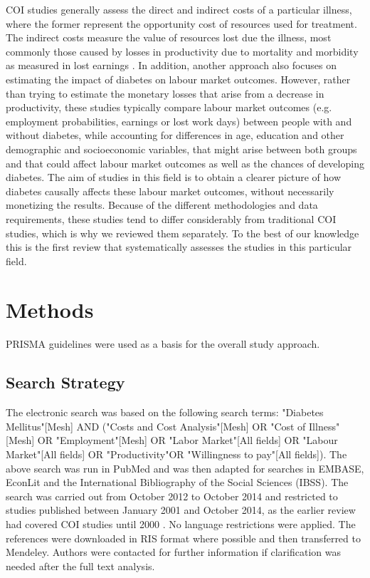 \documentclass[12pt,english]{article}
\begin{document}
\ac{COI} studies generally assess the direct and indirect costs of a particular illness, where the former represent the opportunity cost of resources used for treatment. The indirect costs measure the value of resources lost due the illness, most commonly those caused by losses in productivity due to mortality and morbidity as measured in lost earnings \parencite{Segel2006}. In addition, another approach also focuses on estimating the impact of diabetes on labour market outcomes. However, rather than trying to estimate the monetary losses that arise from a decrease in productivity, these studies typically compare labour market outcomes (e.g. employment probabilities, earnings or lost work days) between people with and without diabetes, while accounting for differences in age, education and other demographic and socioeconomic variables, that might arise between both groups and that could affect labour market outcomes as well as the chances of developing diabetes. The aim of studies in this field is to obtain a clearer picture of how diabetes causally affects these labour market outcomes, without necessarily monetizing the results. Because of the different methodologies and data requirements, these studies tend to differ considerably from traditional \ac{COI} studies, which is why we reviewed them separately. To the best of our knowledge this is the first review that systematically assesses the studies in this particular field.

\section{Methods}

\ac{PRISMA} guidelines were used as a basis for the overall study approach.\parencite{Moher2009b}
\subsection{Search Strategy}
The electronic search was based on the following search terms: "Diabetes Mellitus"[Mesh] AND ("Costs and Cost Analysis"[Mesh] OR "Cost of Illness"[Mesh] OR "Employment"[Mesh] OR "Labor Market"[All fields] OR "Labour Market"[All fields] OR "Productivity"OR "Willingness to pay"[All fields]). The above search was run in PubMed and was then adapted for searches in EMBASE, EconLit and the International Bibliography of the Social Sciences (IBSS). The search was carried out from October 2012 to October 2014 and restricted to studies published between January 2001 and October 2014, as the earlier review had covered \ac{COI} studies until 2000 \parencite{Ettaro2004}. No language restrictions were applied. The references were downloaded in RIS format where possible and then transferred to Mendeley. Authors were contacted for further information if clarification was needed after the full text analysis.
\end{document}
